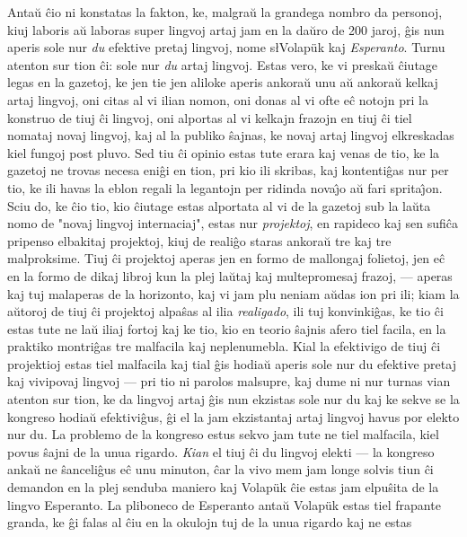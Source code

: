    Anta\u u \^cio ni konstatas la fakton, ke, malgra\u u la grandega nombro
da personoj, kiuj laboris a\u u laboras super lingvoj artaj jam en
la da\u uro de 200 jaroj, \^gis nun aperis sole nur {\sl du}
efektive pretaj lingvoj, nome {s\l Volap\"uk} kaj {\sl Esperanto}.
Turnu atenton sur tion \^ci: sole nur {\sl du} artaj lingvoj. Estas
vero, ke vi preska\u u \^ciutage legas en la gazetoj, ke jen tie jen
aliloke aperis ankora\u u unu a\u u ankora\u u kelkaj artaj lingvoj,
oni citas al vi ilian nomon, oni donas al vi ofte e\^c notojn pri la
konstruo de tiuj \^ci lingvoj, oni alportas al vi kelkajn frazojn en
tiuj \^ci tiel nomataj novaj lingvoj, kaj al la publiko \^sajnas, ke
novaj artaj lingvoj elkreskadas kiel fungoj post pluvo. Sed tiu \^ci
opinio estas tute erara kaj venas de tio, ke la gazetoj ne trovas
necesa eni\^gi en tion, pri kio ili skribas, kaj kontenti\^gas nur
per tio, ke ili havas la eblon regali la legantojn per ridinda
nova\^{\j}o a\u u fari sprita\^{\j}on. Sciu do, ke \^cio tio, kio
\^ciutage estas alportata al vi de la gazetoj sub la la\u uta nomo
de "novaj lingvoj internaciaj", estas nur {\sl projektoj}, en
rapideco kaj sen sufi\^ca pripenso elbakitaj projektoj, kiuj de
reali\^go staras ankora\u u tre kaj tre malproksime. Tiuj \^ci
projektoj aperas jen en formo de mallongaj folietoj, jen e\^c en la
formo de dikaj libroj kun la plej la\u utaj kaj multepromesaj
frazoj,
--- aperas kaj tuj malaperas de la horizonto, kaj vi jam plu neniam
a\u udas ion pri ili; kiam la a\u utoroj de tiuj \^ci projektoj
alpa\^sas al ilia {\sl realigado}, ili tuj konvinki\^gas, ke tio
\^ci estas tute ne la\u u iliaj fortoj kaj ke tio, kio en teorio
\^sajnis afero tiel facila, en la praktiko montri\^gas tre malfacila
kaj neplenumebla. Kial la efektivigo de tiuj \^ci projektioj estas
tiel malfacila kaj tial \^gis hodia\u u aperis sole nur du efektive
pretaj kaj vivipovaj lingvoj --- pri tio ni parolos malsupre, kaj
dume ni nur turnas vian atenton sur tion, ke da lingvoj artaj \^gis
nun ekzistas sole nur du kaj ke sekve se la kongreso hodia\u u
efektivi\^gus, \^gi el la jam ekzistantaj artaj lingvoj havus por
elekto nur du. La problemo de la kongreso estus sekvo jam tute ne
tiel malfacila, kiel povus \^sajni de la unua rigardo. {\sl Kian} el
tiuj \^ci du lingvoj elekti --- la kongreso anka\u u ne
\^sanceli\^gus e\^c unu minuton, \^car la vivo mem jam longe solvis
tiun \^ci demandon en la plej senduba maniero kaj Volap\"uk \^cie
estas jam elpu\^sita de la lingvo Esperanto. La pliboneco de
Esperanto anta\u u Volap\"uk estas tiel frapante granda, ke \^gi
falas al \^ciu en la okulojn tuj de la unua rigardo kaj ne estas

